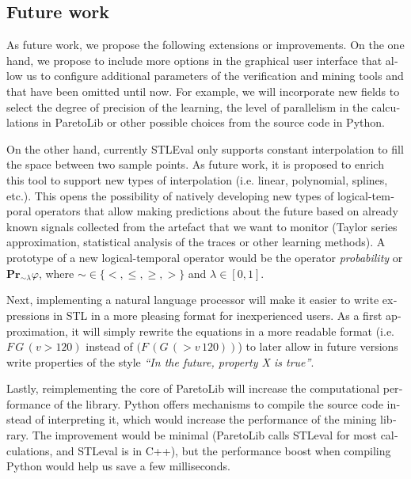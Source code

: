 \begin{otherlanguage}{british}
\section{Future work}
As future work, we propose the following extensions or improvements. On the one hand, we propose to include more options in the graphical user interface that allow us to configure additional parameters of the verification and mining tools and that have been omitted until now. For example, we will incorporate new fields to select the degree of precision of the learning, the level of parallelism in the calculations in ParetoLib or other possible choices from the source code in Python.


On the other hand, currently STLEval only supports constant interpolation to fill the space between two sample points. As future work, it is proposed to enrich this tool to support new types of interpolation (i.e. linear, polynomial, splines, etc.). This opens the possibility of natively developing new types of logical-temporal operators that allow making predictions about the future based on already known signals collected from the artefact that we want to monitor (Taylor series approximation, statistical analysis of the traces or other learning methods). A prototype of a new logical-temporal operator would be the operator \textit{probability} or $\mathbf{Pr}_{\sim \lambda}\varphi$, where $\sim \in \{<, \leq, \geq, >\}$ and $\lambda \in [0, 1]$.

Next, implementing a natural language processor will make it easier to write expressions in STL in a more pleasing format for inexperienced users. As a first approximation, it will simply rewrite the equations in a more readable format (i.e. $F\, G\, (v > 120)$ instead of $(F \, (G \, ( > v \, 120))$) to later allow in future versions write properties of the style \textit{``In the future, property X is true''}.

Lastly, reimplementing the core of ParetoLib will increase the computational performance of the library. Python offers mechanisms to compile the source code instead of interpreting it, which would increase the performance of the mining library. The improvement would be minimal (ParetoLib calls STLeval for most calculations, and STLeval is in C++), but the performance boost when compiling Python would help us save a few milliseconds.
\end{otherlanguage}